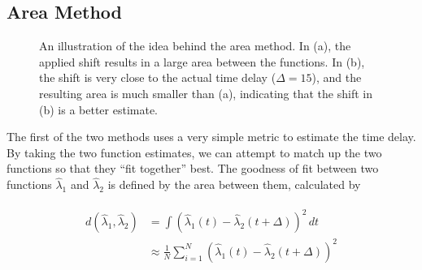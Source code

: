 \documentclass[a4paper,11pt]{article}
\begin{document}
\subsection{Area Method}
\label{sec-4-1}

   \begin{figure}[]

   \caption{An illustration of the idea behind the area method. In (a), the
   applied shift results in a large area between the functions. In (b), the
   shift is very close to the actual time delay ($\Delta=15$), and the resulting
   area is much smaller than (a), indicating that the shift in (b) is a better
   estimate.}

   \label{fig:areamethod}
   \end{figure}
   The first of the two methods uses a very simple metric to estimate the time
   delay. By taking the two function estimates, we can attempt to match up the
   two functions so that they ``fit together'' best. The goodness of fit between
   two functions $\hat{\lambda}_1$ and $\hat{\lambda}_2$ is defined by the area
   between them, calculated by

   \begin{align}
   \begin{split}
   d(\hat{\lambda}_1,\hat{\lambda}_2)&=\int(\hat{\lambda}_1(t)-\hat{\lambda}_2(t+\Delta))^2\,dt\\
   &\approx\frac{1}{N}\sum_{i=1}^N(\hat{\lambda}_1(t)-\hat{\lambda}_2(t+\Delta))^2
   \end{split}
   \end{align}
\end{document}
